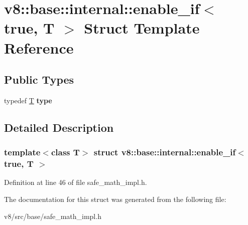 \hypertarget{structv8_1_1base_1_1internal_1_1enable__if_3_01true_00_01T_01_4}{}\section{v8\+:\+:base\+:\+:internal\+:\+:enable\+\_\+if$<$ true, T $>$ Struct Template Reference}
\label{structv8_1_1base_1_1internal_1_1enable__if_3_01true_00_01T_01_4}
\subsection*{Public Types}
\begin{DoxyCompactItemize}
\item 
\mbox{\label{structv8_1_1base_1_1internal_1_1enable__if_3_01true_00_01T_01_4_a0990faefecf53f01f4922e66b64bc31a}} 
typedef \mbox{\hyperlink{classv8_1_1internal_1_1torque_1_1T}{T}} {\bfseries type}
\end{DoxyCompactItemize}


\subsection{Detailed Description}
\subsubsection*{template$<$class T$>$\newline
struct v8\+::base\+::internal\+::enable\+\_\+if$<$ true, T $>$}



Definition at line 46 of file safe\+\_\+math\+\_\+impl.\+h.



The documentation for this struct was generated from the following file\+:\begin{DoxyCompactItemize}
\item 
v8/src/base/safe\+\_\+math\+\_\+impl.\+h\end{DoxyCompactItemize}
